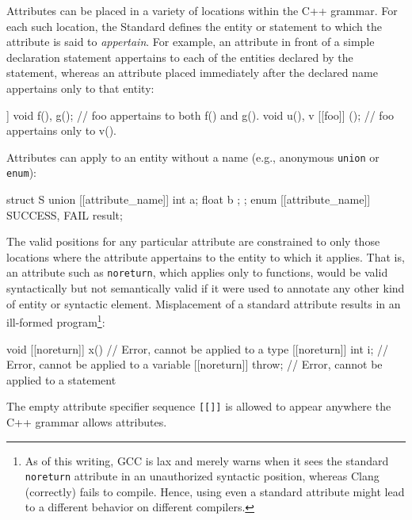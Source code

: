 Attributes can be placed in a variety of locations within the C++ grammar.  For each such location, the Standard defines the entity or statement to which the attribute is said to \emph{appertain}. For example, an attribute in front of a simple declaration statement appertains to each of the entities declared by the statement, whereas an attribute placed immediately after the declared name appertains only to that entity:

\begin{emcppslisting}[language=C]
[[foo]] void f(), g();   // foo appertains to both f() and g().
void u(), v [[foo]] ();  // foo appertains only to v().
\end{emcppslisting}

\noindent Attributes can apply to an entity without a name (e.g., anonymous \lstinline!union! or \lstinline!enum!):

\begin{emcppslisting}[language=C++]
struct S { union [[attribute_name]] { int a; float b }; };
enum [[attribute_name]] { SUCCESS, FAIL } result;
\end{emcppslisting}

\noindent The valid positions for any particular attribute are constrained to only those locations 
where the attribute appertains to the entity to which it applies. That is, an attribute such as \lstinline!noreturn!, 
which applies only to functions, would be valid syntactically but not semantically valid if it were used to annotate
any other kind of entity or syntactic element.  Misplacement of a standard attribute results
in an ill-formed program\footnote{As of this writing, GCC is lax and merely
warns when it sees the standard \lstinline!noreturn! attribute in an
unauthorized syntactic position, whereas Clang (correctly) fails to
compile. Hence, using even a standard attribute might
  lead to a different behavior on different compilers.}:

\begin{emcppslisting}[language=C]
void [[noreturn]] x() {       // Error, cannot be applied to a type
     [[noreturn]] int i;      // Error, cannot be applied to a variable
     [[noreturn]] { throw; }  // Error, cannot be applied to a statement
} 
\end{emcppslisting}

\noindent The empty attribute specifier sequence \lstinline![[]]! is allowed to appear anywhere the C++ grammar allows attributes. 

    

